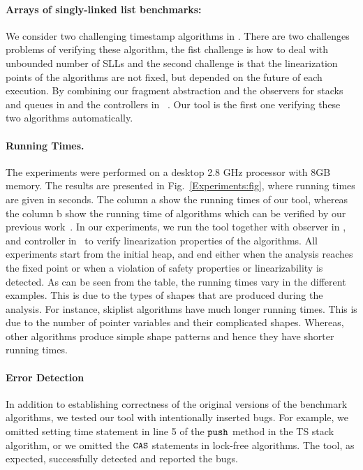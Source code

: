 \paragraph{Arrays of singly-linked list benchmarks:} We consider two challenging timestamp algorithms in \cite{ts-stack}. There are two challenges problems of verifying these algorithm, the fist challenge is how to deal with unbounded number of SLLs and the second challenge is that the linearization points of the algorithms are not fixed, but depended on the future of each execution. By combining our fragment abstraction and the observers for stacks and queues in \cite{BEEH:icalp15} and the controllers in~\cite{Quy:sas16} . Our tool is the first one verifying these two algorithms automatically.

\paragraph{Running Times.}The experiments were performed on a desktop 2.8 GHz processor with 8GB memory. The results are presented in Fig.~\ref{Experiments:fig}, where running times are given in seconds. The column \textsf{a} show the running times of our tool, whereas the column \textsf{b} show the running time of algorithms which can be verified by our previous work~\cite{Quy:sas16}.  In our experiments, we run the tool together with observer in \cite{AHHR:integrated:short}, \cite{BEEH:icalp15} and controller in~\cite{Quy:sas16} to verify linearization properties of the algorithms. All experiments start from the initial heap,  
and end either when the analysis reaches the fixed point or when a violation of safety properties or linearizability is detected. As can be seen from the table, the running times vary in the different examples. This is due to the types of shapes that are produced during the analysis. For instance, skiplist algorithms have much longer running times. This is due to the number of pointer variables and their complicated shapes. Whereas, other algorithms 
produce simple shape patterns and hence they have shorter running times.
\paragraph{Error Detection}
 In addition to establishing correctness of the original versions of the
benchmark algorithms, we tested our tool with intentionally inserted bugs. For example, we omitted setting time statement in line 5 of the ${\tt push}$ method in the TS stack algorithm, or we omitted the $\tt CAS$ statements in lock-free algorithms. The tool, as expected, successfully detected and reported the bugs. 
 

